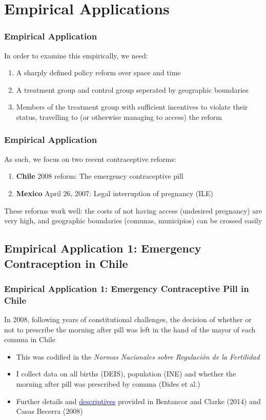 \documentclass[10pt,letterpaper,subeqn]{beamer}
\begin{document}
\section{Empirical Applications}
\begin{frame}[label=empir1]
  \frametitle{Empirical Application}
In order to examine this empirically, we need:
\vspace{4mm}
\begin{enumerate}
\item A sharply defined policy reform over space and time
\item A treatment group and control group seperated by geographic boundaries
\item Members of the treatment group with sufficient incentives to violate their
status, travelling to (or otherwise managing to access) the reform
\end{enumerate}
\end{frame}

\begin{frame}[label=empir2]
  \frametitle{Empirical Application}
As such, we focus on two recent contraceptive reforms:
\vspace{6mm}
\begin{enumerate}
\item \textbf{Chile} 2008 reform: The emergency contraceptive pill
\item \textbf{Mexico} April 26, 2007: Legal interruption of pregnancy (ILE)
\end{enumerate}
\vspace{6mm}
These reforms work well: the costs of not having access (undesired pregnancy) are
very high, and geographic boundaries (comunas, municipios) can be crossed easily
\end{frame}


\subsection{Empirical Application 1: Emergency Contraception in Chile}
\begin{frame}[label=empirA]
  \frametitle{Empirical Application 1: Emergency Contraceptive Pill in Chile} 
In 2008, following years of constitutional challenges, the decision of whether
or not to prescribe the morning after pill was left in the hand of the mayor of
each comuna in Chile
\vspace{5mm}
\begin{itemize}
\item This was codified in the \emph{Normas Nacionales sobre Regulaci\'on de la 
Fertilidad}
\item I collect data on all births (DEIS), population (INE) and whether the 
morning after pill was prescribed by comuna (Dides et al.)
\item Further details and \hyperlink{ChileDesc}{\textcolor{blue}{descriptives}} provided 
in Bentancor and Clarke (2014) and Casas Becerra (2008)
\end{itemize}
\end{frame}
\end{document}
